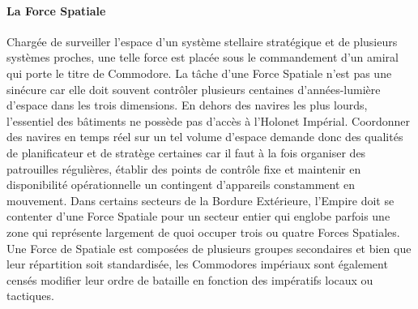 \documentclass[twoside]{article}
\begin{document}
\paragraph{La Force Spatiale}
Chargée de surveiller l'espace d'un système stellaire stratégique et de plusieurs systèmes proches, une telle force est placée sous le commandement d'un amiral qui porte le titre de Commodore. La tâche d'une Force Spatiale n'est pas une sinécure car elle doit souvent contrôler plusieurs centaines d'années-lumière d'espace dans les trois dimensions. En dehors des navires les plus lourds, l'essentiel des bâtiments ne possède pas d'accès à l'Holonet Impérial. Coordonner des navires en temps réel sur un tel volume d'espace demande donc des qualités de planificateur et de stratège certaines car il faut à la fois organiser des patrouilles régulières, établir des points de contrôle fixe et maintenir en disponibilité opérationnelle un contingent d'appareils constamment en mouvement. Dans certains secteurs de la Bordure Extérieure, l'Empire doit se contenter d'une Force Spatiale pour un secteur entier qui englobe parfois une zone qui représente largement de quoi occuper trois ou quatre Forces Spatiales.
Une Force de Spatiale est composées de plusieurs groupes secondaires et bien que leur répartition soit standardisée, les Commodores impériaux sont également censés modifier leur ordre de bataille en fonction des impératifs locaux ou tactiques.
\end{document}
